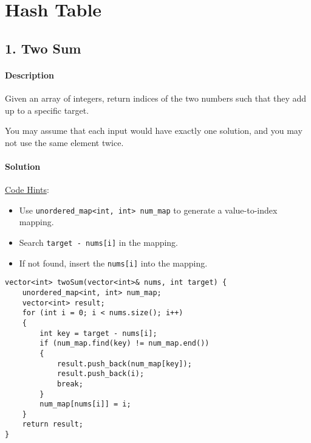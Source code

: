 \section{Hash Table}

\subsection{1. Two Sum}

\paragraph{Description}

Given an array of integers, return indices of the two numbers such that they add up to a specific target.

You may assume that each input would have exactly one solution, and you may not use the same element twice.

\paragraph{Solution}

\underline{Code Hints}:
\begin{itemize}
    \item Use \texttt{unordered_map<int, int> num_map} to generate a value-to-index mapping.
    \item Search \texttt{target - nums[i]} in the mapping.
    \item If not found, insert the \texttt{nums[i]} into the mapping.
\end{itemize}

\begin{verbatim}
vector<int> twoSum(vector<int>& nums, int target) {
    unordered_map<int, int> num_map;
    vector<int> result;
    for (int i = 0; i < nums.size(); i++)
    {
        int key = target - nums[i];
        if (num_map.find(key) != num_map.end())
        {
            result.push_back(num_map[key]);
            result.push_back(i);
            break;
        }
        num_map[nums[i]] = i;
    }
    return result;
}
\end{verbatim}